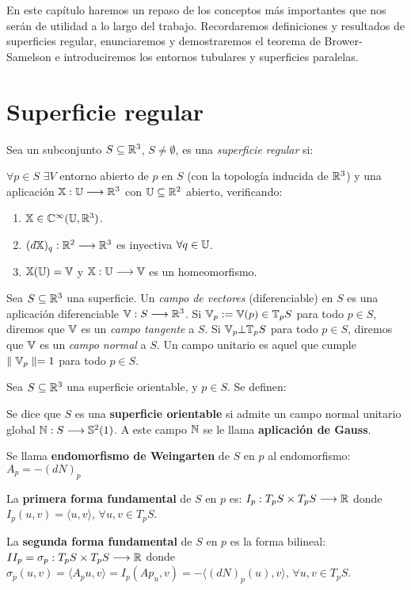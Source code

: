 En este capítulo haremos un repaso de los conceptos más importantes que nos serán de utilidad a lo largo del trabajo. Recordaremos definiciones y resultados de superficies regular, enunciaremos y demostraremos el teorema de Brower-Samelson e introduciremos los entornos tubulares y superficies paralelas.

\section{Superficie regular}

\begin{definition}
Sea un subconjunto $S \subseteq \mathbb{R}^3$, $S \neq \emptyset$, es una \textit{superficie regular} si:

$\forall p \in S$ $\exists V$ entorno abierto de $p$ en $S$ (con la topología inducida de $\mathbb{R}^3$) y una aplicación $\mathbb{X}: \mathbb{U} \longrightarrow \mathbb{R}^3$ con $\mathbb{U} \subseteq \mathbb{R}^2$ abierto, verificando:

\begin{enumerate}
    \item $\mathbb{X} \in \mathbb{C}^\infty(\mathbb{U}, \mathbb{R}^3)$.
    \item $(d\mathbb{X})_{q}: \mathbb{R}^2 \longrightarrow \mathbb{R}^3$ es inyectiva $\forall q \in \mathbb{U}$.
    \item $\mathbb{X}(\mathbb{U}) = \mathbb{V}$ y $\mathbb{X}:\mathbb{U} \longrightarrow \mathbb{V}$ es un homeomorfismo.
\end{enumerate}
\end{definition}

Sea $S \subseteq \mathbb{R}^3$ una superficie. Un \textit{campo de vectores} (diferenciable) en $S$ es una aplicación diferenciable $\mathbb{V}: S \longrightarrow \mathbb{R}^3$. Si $\mathbb{V}_p := \mathbb{V}(p) \in \mathbb{T}_p S$ para todo $p \in S$, diremos que $\mathbb{V}$ es un \textit{campo tangente} a $S$. Si $\mathbb{V}_p \bot \mathbb{T}_p S$ para todo $p \in S$, diremos que $\mathbb{V}$ es un \textit{campo normal} a $S$. Un campo unitario es aquel que cumple $\parallel \mathbb{V}_p \parallel = 1$ para todo $p \in S$.

Sea $S \subseteq \mathbb{R}^3$ una superficie orientable, y $p \in S$. Se definen:

Se dice que $S$ es una \textbf{superficie orientable} si admite un campo normal unitario global $\mathbb{N}: S \longrightarrow \mathbb{S}^2(1)$. A este campo $\mathbb{N}$ se le llama \textbf{aplicación de Gauss}.

Se llama \textbf{endomorfismo de Weingarten} de $S$ en $p$ al endomorfismo: $A_p = -(dN)_p$

\begin{definition}
La \textbf{primera forma fundamental} de $S$ en $p$ es: $I_p: T_pS \times T_pS \longrightarrow \mathbb{R}$ donde $I_p(u,v) =  \langle u,v \rangle $, $\forall u,v \in T_pS$.

La \textbf{segunda forma fundamental} de $S$ en $p$ es la forma bilineal: $II_p = \sigma_p: T_pS \times T_pS \longrightarrow \mathbb{R}$ donde $\sigma_p(u,v) =  \langle A_pu,v \rangle  = I_p(Ap_u,v) = - \langle (dN)_p(u), v \rangle $, $\forall u,v \in T_pS$.
\end{definition}

